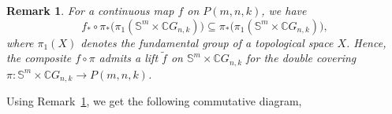 \documentclass{amsart}
\newtheorem{remark}[theorem]{Remark}
\newcommand{\remref}[1]{Remark~\ref{#1}}
\begin{document}
	\begin{remark}\label{lift}
		For a continuous map $f$ on $P(m,n,k)$, we have  
		\begin{equation} \label{lift of f}
			f_*\circ \pi_*\big(\pi_1(\mathbb{S}^m\times \mathbb{C}G_{n,k})\big)
			\subseteq \pi_*\big(\pi_1(\mathbb{S}^m\times \mathbb{C}G_{n,k})\big),
		\end{equation}
		where $\pi_1(X)$ denotes the fundamental group of a topological space $X$. Hence, the composite $f\circ \pi$ admits a lift $\tilde f$ on
		$\mathbb{S}^m\times \mathbb{C}G_{n,k}$ for the double covering  
		$\pi:\mathbb{S}^m\times \mathbb{C}G_{n,k}\to P(m,n,k)$.
	\end{remark}
	Using \remref{lift}, we get the following commutative %
diagram,
	
\end{document}
